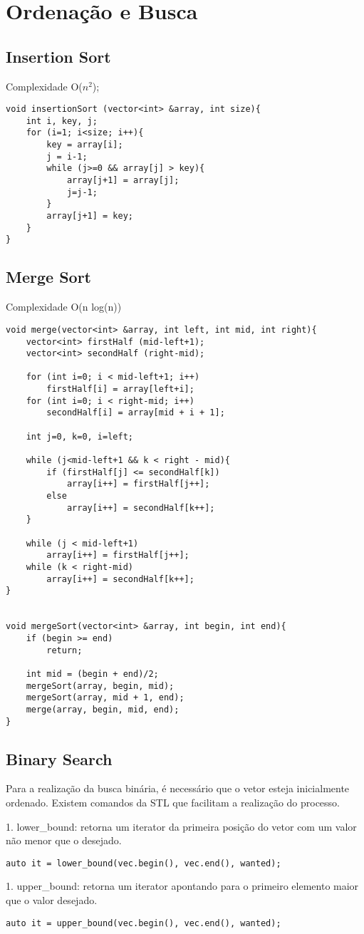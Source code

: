 \section{Ordenação e Busca}

\subsection{Insertion Sort}
Complexidade O($n^2$);
\begin{verbatim}
void insertionSort (vector<int> &array, int size){
    int i, key, j;
    for (i=1; i<size; i++){
        key = array[i];
        j = i-1;
        while (j>=0 && array[j] > key){
            array[j+1] = array[j];
            j=j-1;
        }
        array[j+1] = key;
    }
}
\end{verbatim}

\subsection{Merge Sort}
Complexidade O(n log(n))
\begin{verbatim}
void merge(vector<int> &array, int left, int mid, int right){
    vector<int> firstHalf (mid-left+1);
    vector<int> secondHalf (right-mid);
 
    for (int i=0; i < mid-left+1; i++)  
        firstHalf[i] = array[left+i];
    for (int i=0; i < right-mid; i++)
        secondHalf[i] = array[mid + i + 1];

    int j=0, k=0, i=left; 

    while (j<mid-left+1 && k < right - mid){
        if (firstHalf[j] <= secondHalf[k])
            array[i++] = firstHalf[j++];
        else
            array[i++] = secondHalf[k++];
    }

    while (j < mid-left+1)
        array[i++] = firstHalf[j++];
    while (k < right-mid)
        array[i++] = secondHalf[k++];
}
 

void mergeSort(vector<int> &array, int begin, int end){
    if (begin >= end)
        return;
 
    int mid = (begin + end)/2;
    mergeSort(array, begin, mid);
    mergeSort(array, mid + 1, end);
    merge(array, begin, mid, end);
}
\end{verbatim}

\subsection{Binary Search}
Para a realização da busca binária, é necessário que o vetor esteja inicialmente ordenado. Existem comandos da STL que facilitam a realização do processo.

1. lower\_bound: retorna um iterator da primeira posição do vetor com um valor não menor que o desejado.
\begin{verbatim}
auto it = lower_bound(vec.begin(), vec.end(), wanted);
\end{verbatim}

1. upper\_bound: retorna um iterator apontando para o primeiro elemento maior que o valor desejado.
\begin{verbatim}
auto it = upper_bound(vec.begin(), vec.end(), wanted);
\end{verbatim}


